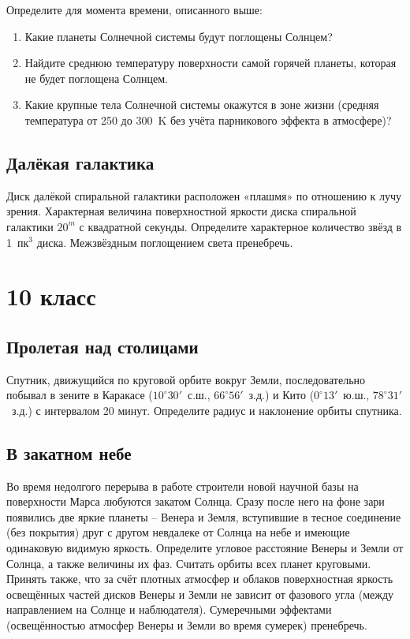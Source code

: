 \documentclass[12pt]{article}
\begin{document}
Определите для момента времени, описанного выше:
\begin{enumerate}
  \item Какие планеты Солнечной системы будут поглощены Солнцем?
  \item Найдите среднюю температуру поверхности самой горячей планеты, которая не
        будет поглощена Солнцем.
  \item Какие крупные тела Солнечной системы окажутся в зоне жизни (средняя
        температура от 250 до 300~K без учёта парникового эффекта в атмосфере)?
\end{enumerate}

\subsection{Далёкая галактика}
Диск далёкой спиральной галактики расположен «плашмя» по отношению к лучу зрения.
Характерная величина поверхностной яркости диска спиральной галактики $20^m$ с
квадратной секунды. Определите характерное количество звёзд в 1~пк$^3$ диска.
Межзвёздным поглощением света пренебречь.

\clearpage
\section*{10 класс}

\subsection{Пролетая над столицами}
Спутник, движущийся по круговой орбите вокруг Земли, последовательно побывал в
зените в Каракасе ($10^\circ30'$~с.ш., $66^\circ56'$~з.д.) и Кито ($0^\circ13'$~ю.ш.,
$78^\circ31'$~з.д.) с интервалом 20 минут. Определите радиус и наклонение орбиты
спутника.

\subsection{В закатном небе}
Во время недолгого перерыва в работе строители новой научной базы на поверхности
Марса любуются закатом Солнца. Сразу после него на фоне зари появились две яркие
планеты -- Венера и Земля, вступившие в тесное соединение (без покрытия) друг с
другом невдалеке от Солнца на небе и имеющие одинаковую видимую яркость. Определите
угловое расстояние Венеры и Земли от Солнца, а также величины их фаз. Считать орбиты
всех планет круговыми. Принять также, что за счёт плотных атмосфер и облаков
поверхностная яркость освещённых частей дисков Венеры и Земли не зависит от фазового
угла (между направлением на Солнце и наблюдателя). Сумеречными эффектами
(освещённостью атмосфер Венеры и Земли во время сумерек) пренебречь.
\end{document}

